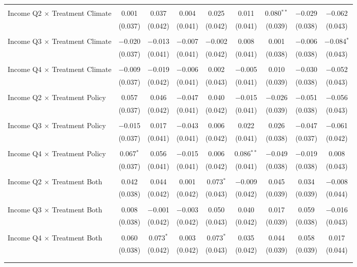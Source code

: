 \begin{tabular}{@{\extracolsep{5pt}}lcccccccc}
  & & & & & & & & \\ 
 Income Q2 $\times$ Treatment Climate & 0.001 & 0.037 & 0.004 & 0.025 & 0.011 & 0.080$^{**}$ & $-$0.029 & $-$0.062 \\ 
  & (0.037) & (0.042) & (0.041) & (0.042) & (0.041) & (0.039) & (0.038) & (0.043) \\ 
  & & & & & & & & \\ 
 Income Q3 $\times$ Treatment Climate & $-$0.020 & $-$0.013 & $-$0.007 & $-$0.002 & 0.008 & 0.001 & $-$0.006 & $-$0.084$^{*}$ \\ 
  & (0.037) & (0.041) & (0.041) & (0.042) & (0.041) & (0.038) & (0.038) & (0.043) \\ 
  & & & & & & & & \\ 
 Income Q4 $\times$ Treatment Climate & $-$0.009 & $-$0.019 & $-$0.006 & 0.002 & $-$0.005 & 0.010 & $-$0.030 & $-$0.052 \\ 
  & (0.037) & (0.042) & (0.041) & (0.043) & (0.041) & (0.039) & (0.038) & (0.043) \\ 
  & & & & & & & & \\ 
 Income Q2 $\times$ Treatment Policy & 0.057 & 0.046 & $-$0.047 & 0.040 & $-$0.015 & $-$0.026 & $-$0.051 & $-$0.056 \\ 
  & (0.037) & (0.042) & (0.041) & (0.042) & (0.041) & (0.039) & (0.038) & (0.043) \\ 
  & & & & & & & & \\ 
 Income Q3 $\times$ Treatment Policy & $-$0.015 & 0.017 & $-$0.043 & 0.006 & 0.022 & 0.026 & $-$0.047 & $-$0.061 \\ 
  & (0.037) & (0.041) & (0.041) & (0.042) & (0.041) & (0.038) & (0.037) & (0.042) \\ 
  & & & & & & & & \\ 
 Income Q4 $\times$ Treatment Policy & 0.067$^{*}$ & 0.056 & $-$0.015 & 0.006 & 0.086$^{**}$ & $-$0.049 & $-$0.019 & 0.008 \\ 
  & (0.037) & (0.041) & (0.041) & (0.042) & (0.041) & (0.038) & (0.038) & (0.043) \\ 
  & & & & & & & & \\ 
 Income Q2 $\times$ Treatment Both & 0.042 & 0.044 & 0.001 & 0.073$^{*}$ & $-$0.009 & 0.045 & 0.034 & $-$0.008 \\ 
  & (0.038) & (0.042) & (0.042) & (0.043) & (0.042) & (0.039) & (0.039) & (0.044) \\ 
  & & & & & & & & \\ 
 Income Q3 $\times$ Treatment Both & 0.008 & $-$0.001 & $-$0.003 & 0.050 & 0.040 & 0.017 & 0.059 & $-$0.016 \\ 
  & (0.038) & (0.042) & (0.042) & (0.043) & (0.042) & (0.039) & (0.038) & (0.043) \\ 
  & & & & & & & & \\ 
 Income Q4 $\times$ Treatment Both & 0.060 & 0.073$^{*}$ & 0.003 & 0.073$^{*}$ & 0.035 & 0.044 & 0.058 & 0.017 \\ 
  & (0.038) & (0.042) & (0.042) & (0.043) & (0.042) & (0.039) & (0.039) & (0.044) \\ 
  & & & & & & & & \\ 
\hline \\[-1.8ex] 


\end{tabular}
